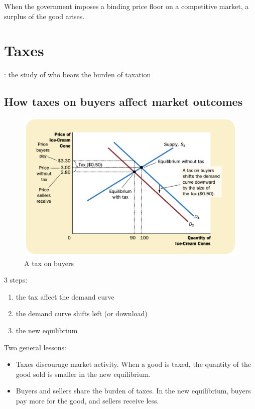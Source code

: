 When the government imposes a binding price floor on a competitive market, a surplus of the good arises.


\section{Taxes}

\begin{tcolorbox}
  :
  the study of who bears the burden of taxation
\end{tcolorbox}

\subsection{How taxes on buyers affect market outcomes}

\begin{figure}[!ht]
  \centering
  \includegraphics[width=\textwidth]{pics/tax1}
  \caption{A tax on buyers}
  \label{fig:tax1}
\end{figure}

3 steps:
\begin{enumerate}
\item the tax affect the demand curve
\item the demand curve shifts left (or download)
\item the new equilibrium
\end{enumerate}


Two general lessons:
\begin{itemize}
\item Taxes discourage market activity. When a good is taxed, the quantity of the good sold is smaller in the new equilibrium.
\item Buyers and sellers share the burden of taxes. In the new equilibrium, buyers pay more for the good, and sellers receive less.
\end{itemize}

